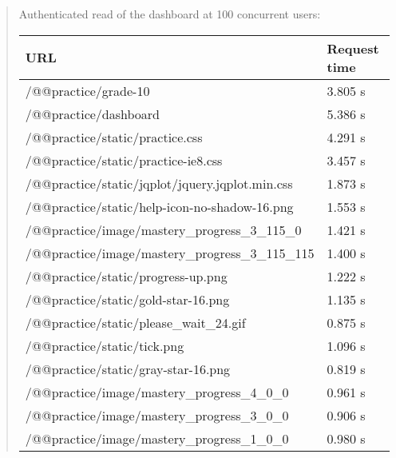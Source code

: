 \documentclass[letterpaper,10pt,english]{sphinxmanual}
\begin{document}
\label{index:dashboard}\begin{quote}

Authenticated read of the dashboard at 100 concurrent users:

\begin{tabulary}{\linewidth}{|L|L|}
\hline
\textbf{\relax 
URL
} & \textbf{\relax 
Request time
}\\\hline

/@@practice/grade-10
 & 
3.805 s
\\\hline

/@@practice/dashboard
 & 
5.386 s
\\\hline

/@@practice/static/practice.css
 & 
4.291 s
\\\hline

/@@practice/static/practice-ie8.css
 & 
3.457 s
\\\hline

/@@practice/static/jqplot/jquery.jqplot.min.css
 & 
1.873 s
\\\hline

/@@practice/static/help-icon-no-shadow-16.png
 & 
1.553 s
\\\hline

/@@practice/image/mastery\_progress\_3\_115\_0
 & 
1.421 s
\\\hline

/@@practice/image/mastery\_progress\_3\_115\_115
 & 
1.400 s
\\\hline

/@@practice/static/progress-up.png
 & 
1.222 s
\\\hline

/@@practice/static/gold-star-16.png
 & 
1.135 s
\\\hline

/@@practice/static/please\_wait\_24.gif
 & 
0.875 s
\\\hline

/@@practice/static/tick.png
 & 
1.096 s
\\\hline

/@@practice/static/gray-star-16.png
 & 
0.819 s
\\\hline

/@@practice/image/mastery\_progress\_4\_0\_0
 & 
0.961 s
\\\hline

/@@practice/image/mastery\_progress\_3\_0\_0
 & 
0.906 s
\\\hline

/@@practice/image/mastery\_progress\_1\_0\_0
 & 
0.980 s
\\\hline


\end{tabulary}
\end{quote}
\end{document}

